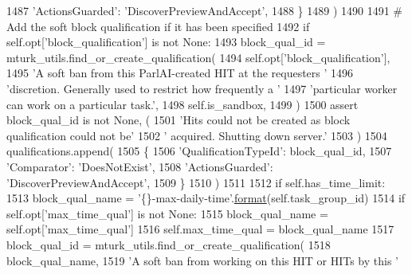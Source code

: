 \begin{DoxyCode}
1487                     \textcolor{stringliteral}{'ActionsGuarded'}: \textcolor{stringliteral}{'DiscoverPreviewAndAccept'},
1488                 \}
1489             )
1490 
1491         \textcolor{comment}{# Add the soft block qualification if it has been specified}
1492         \textcolor{keywordflow}{if} self.opt[\textcolor{stringliteral}{'block\_qualification'}] \textcolor{keywordflow}{is} \textcolor{keywordflow}{not} \textcolor{keywordtype}{None}:
1493             block\_qual\_id = mturk\_utils.find\_or\_create\_qualification(
1494                 self.opt[\textcolor{stringliteral}{'block\_qualification'}],
1495                 \textcolor{stringliteral}{'A soft ban from this ParlAI-created HIT at the requesters '}
1496                 \textcolor{stringliteral}{'discretion. Generally used to restrict how frequently a '}
1497                 \textcolor{stringliteral}{'particular worker can work on a particular task.'},
1498                 self.is\_sandbox,
1499             )
1500             \textcolor{keyword}{assert} block\_qual\_id \textcolor{keywordflow}{is} \textcolor{keywordflow}{not} \textcolor{keywordtype}{None}, (
1501                 \textcolor{stringliteral}{'Hits could not be created as block qualification could not be'}
1502                 \textcolor{stringliteral}{' acquired. Shutting down server.'}
1503             )
1504             qualifications.append(
1505                 \{
1506                     \textcolor{stringliteral}{'QualificationTypeId'}: block\_qual\_id,
1507                     \textcolor{stringliteral}{'Comparator'}: \textcolor{stringliteral}{'DoesNotExist'},
1508                     \textcolor{stringliteral}{'ActionsGuarded'}: \textcolor{stringliteral}{'DiscoverPreviewAndAccept'},
1509                 \}
1510             )
1511 
1512         \textcolor{keywordflow}{if} self.has\_time\_limit:
1513             block\_qual\_name = \textcolor{stringliteral}{'\{\}-max-daily-time'}.\hyperlink{namespaceparlai_1_1chat__service_1_1services_1_1messenger_1_1shared__utils_a32e2e2022b824fbaf80c747160b52a76}{format}(self.task\_group\_id)
1514             \textcolor{keywordflow}{if} self.opt[\textcolor{stringliteral}{'max\_time\_qual'}] \textcolor{keywordflow}{is} \textcolor{keywordflow}{not} \textcolor{keywordtype}{None}:
1515                 block\_qual\_name = self.opt[\textcolor{stringliteral}{'max\_time\_qual'}]
1516             self.max\_time\_qual = block\_qual\_name
1517             block\_qual\_id = mturk\_utils.find\_or\_create\_qualification(
1518                 block\_qual\_name,
1519                 \textcolor{stringliteral}{'A soft ban from working on this HIT or HITs by this '}

\end{DoxyCode}
